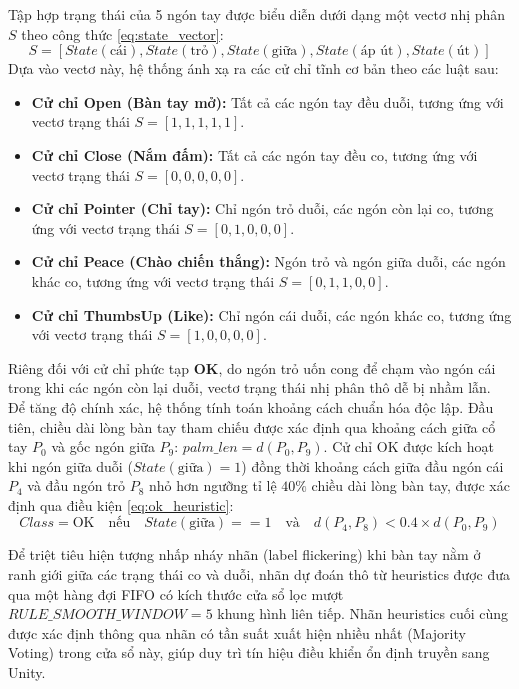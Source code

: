 \documentclass[../BTL.tex]{subfiles}
\begin{document}
Tập hợp trạng thái của 5 ngón tay được biểu diễn dưới dạng một vectơ nhị phân $S$ theo công thức \eqref{eq:state_vector}:
\begin{equation}
\label{eq:state_vector}
S = [State(\text{cái}), State(\text{trỏ}), State(\text{giữa}), State(\text{áp út}), State(\text{út})]
\end{equation}
Dựa vào vectơ này, hệ thống ánh xạ ra các cử chỉ tĩnh cơ bản theo các luật sau:
\begin{itemize}
    \item \textbf{Cử chỉ Open (Bàn tay mở):} Tất cả các ngón tay đều duỗi, tương ứng với vectơ trạng thái $S = [1, 1, 1, 1, 1]$.
    \item \textbf{Cử chỉ Close (Nắm đấm):} Tất cả các ngón tay đều co, tương ứng với vectơ trạng thái $S = [0, 0, 0, 0, 0]$.
    \item \textbf{Cử chỉ Pointer (Chỉ tay):} Chỉ ngón trỏ duỗi, các ngón còn lại co, tương ứng với vectơ trạng thái $S = [0, 1, 0, 0, 0]$.
    \item \textbf{Cử chỉ Peace (Chào chiến thắng):} Ngón trỏ và ngón giữa duỗi, các ngón khác co, tương ứng với vectơ trạng thái $S = [0, 1, 1, 0, 0]$.
    \item \textbf{Cử chỉ ThumbsUp (Like):} Chỉ ngón cái duỗi, các ngón khác co, tương ứng với vectơ trạng thái $S = [1, 0, 0, 0, 0]$.
\end{itemize}

Riêng đối với cử chỉ phức tạp \textbf{OK}, do ngón trỏ uốn cong để chạm vào ngón cái trong khi các ngón còn lại duỗi, vectơ trạng thái nhị phân thô dễ bị nhầm lẫn. Để tăng độ chính xác, hệ thống tính toán khoảng cách chuẩn hóa độc lập. Đầu tiên, chiều dài lòng bàn tay tham chiếu được xác định qua khoảng cách giữa cổ tay $P_0$ và gốc ngón giữa $P_9$: $palm\_len = d(P_0, P_9)$. Cử chỉ OK được kích hoạt khi ngón giữa duỗi ($State(\text{giữa}) = 1$) đồng thời khoảng cách giữa đầu ngón cái $P_4$ và đầu ngón trỏ $P_8$ nhỏ hơn ngưỡng tỉ lệ $40\%$ chiều dài lòng bàn tay, được xác định qua điều kiện \eqref{eq:ok_heuristic}:
\begin{equation}
\label{eq:ok_heuristic}
Class = \text{OK} \quad \text{nếu} \quad State(\text{giữa}) == 1 \quad \text{và} \quad d(P_4, P_8) < 0.4 \times d(P_0, P_9)
\end{equation}

Để triệt tiêu hiện tượng nhấp nháy nhãn (label flickering) khi bàn tay nằm ở ranh giới giữa các trạng thái co và duỗi, nhãn dự đoán thô từ heuristics được đưa qua một hàng đợi FIFO có kích thước cửa sổ lọc mượt $RULE\_SMOOTH\_WINDOW = 5$ khung hình liên tiếp. Nhãn heuristics cuối cùng được xác định thông qua nhãn có tần suất xuất hiện nhiều nhất (Majority Voting) trong cửa sổ này, giúp duy trì tín hiệu điều khiển ổn định truyền sang Unity.
\end{document}
